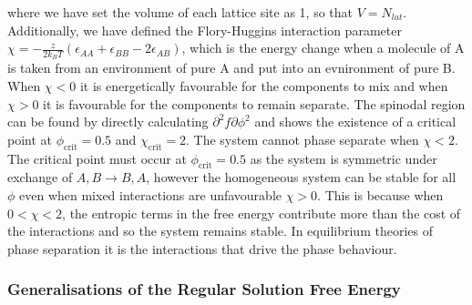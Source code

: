 where we have set the volume of each lattice site as 1, so that $V = N_{lat}$. Additionally, we have defined the Flory-Huggins interaction parameter $\chi = -\frac{z}{2 k_B T} (\epsilon_{AA} + \epsilon_{BB} - 2\epsilon_{AB})$, which is the energy change when a molecule of A is taken from an environment of pure A and put into an evnironment of pure B. When $\chi<0$ it is energetically favourable for the components to mix and when $\chi>0$ it is favourable for the components to remain separate. The spinodal region can be found by directly calculating $\partial^2f\partial\phi^2$ and shows the existence of a critical point at $\phi_\text{crit}=0.5$ and $\chi_\text{crit}=2$. The system cannot phase separate when $\chi<2$. The critical point must occur at $\phi_\text{crit}=0.5$ as the system is symmetric under exchange of $A, B \rightarrow B, A$, however the homogeneous system can be stable for all $\phi$ even when mixed interactions are unfavourable $\chi>0$. This is because when $0<\chi<2$, the entropic terms in the free energy contribute more than the cost of the interactions and so the system remains stable. In equilibrium theories of phase separation it is the interactions that drive the phase behaviour.

\subsubsection{Generalisations of the Regular Solution Free Energy}

